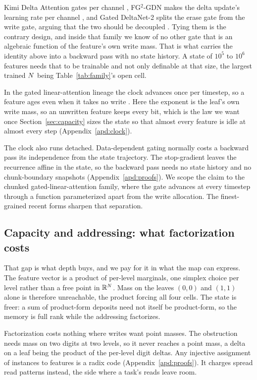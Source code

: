 Kimi Delta Attention gates per channel \citep{kimi2025linear}, FG$^2$-GDN makes the delta update's learning rate per channel \citep{sun2026fg2gdn}, and Gated DeltaNet-2 splits the erase gate from the write gate, arguing that the two should be decoupled \citep{hatamizadeh2026gdn2}. Tying them is the contrary design, and inside that family we know of no other gate that is an algebraic function of the feature's own write mass. That is what carries the identity above into a backward pass with no state history. A state of $10^5$ to $10^6$ features needs that to be trainable and not only definable at that size, the largest trained $N$ being Table~\ref{tab:family}'s open cell.

In the gated linear-attention lineage the clock advances once per timestep, so a feature ages even when it takes no write \citep{yang2024gla, gu2023mamba, yang2024gdn, qin2024hgrn2}. Here the exponent is the leaf's own write mass, so an unwritten feature keeps every bit, which is the law we want once Section~\ref{sec:capacity} sizes the state so that almost every feature is idle at almost every step (Appendix~\ref{apd:clock}).

The clock also runs detached. Data-dependent gating normally costs a backward pass its independence from the state trajectory. The stop-gradient leaves the recurrence affine in the state, so the backward pass needs no state history and no chunk-boundary snapshots (Appendix~\ref{apd:proofs}). We scope the claim to the chunked gated-linear-attention family, where the gate advances at every timestep through a function parameterized apart from the write allocation. The finest-grained recent forms sharpen that separation.

\subsection{Capacity and addressing: what factorization costs}
\label{apd:capacity}

That gap is what depth buys, and we pay for it in what the map can express. The feature vector is a product of per-level marginals, one simplex choice per level rather than a free point in $\mathbb{R}^{N}$. Mass on the leaves $(0,0)$ and $(1,1)$ alone is therefore unreachable, the product forcing all four cells. The state is freer: a sum of product-form deposits need not itself be product-form, so the memory is full rank while the addressing factorizes.

Factorization costs nothing where writes want point masses. The obstruction needs mass on two digits at two levels, so it never reaches a point mass, a delta on a leaf being the product of the per-level digit deltas. Any injective assignment of instances to features is a radix code (Appendix~\ref{apd:proofs}). It charges spread read patterns instead, the side where a task's reads leave room.

